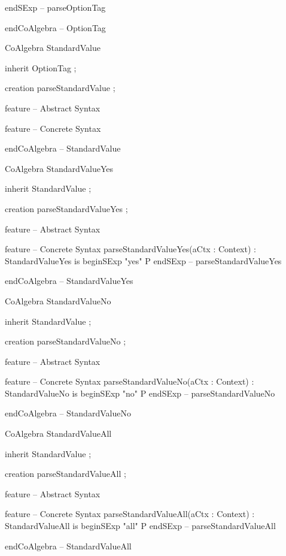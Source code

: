     endSExp -- parseOptionTag

endCoAlgebra -- OptionTag

CoAlgebra StandardValue

inherit
  OptionTag ;

creation
  parseStandardValue ;
  
feature -- Abstract Syntax

feature -- Concrete Syntax

endCoAlgebra -- StandardValue

CoAlgebra StandardValueYes

inherit
  StandardValue ; 

creation
  parseStandardValueYes ;
  
feature -- Abstract Syntax

feature -- Concrete Syntax
  parseStandardValueYes(aCtx : Context) : StandardValueYes is
    beginSExp
      "yes" P
    endSExp -- parseStandardValueYes
  
endCoAlgebra -- StandardValueYes

CoAlgebra StandardValueNo

inherit
  StandardValue ; 

creation
  parseStandardValueNo ;
  
feature -- Abstract Syntax

feature -- Concrete Syntax
  parseStandardValueNo(aCtx : Context) : StandardValueNo is
    beginSExp
      "no" P
    endSExp -- parseStandardValueNo
  
endCoAlgebra -- StandardValueNo

CoAlgebra StandardValueAll

inherit
  StandardValue ; 

creation
  parseStandardValueAll ;
  
feature -- Abstract Syntax

feature -- Concrete Syntax
  parseStandardValueAll(aCtx : Context) : StandardValueAll is
    beginSExp
      "all" P
    endSExp -- parseStandardValueAll
  
endCoAlgebra -- StandardValueAll



\stopJoylol

